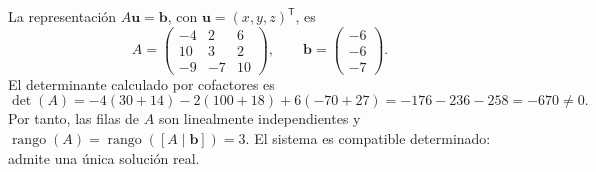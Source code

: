 \documentclass[spanish,letterpaper,oneside]{article}
\begin{document}
La representación $A\mathbf u=\mathbf b$, con $\mathbf u=(x,y,z)^{\mathsf T}$, es
\[
A=\begin{pmatrix}-4&2&6\\10&3&2\\-9&-7&10\end{pmatrix},\qquad
\mathbf b=\begin{pmatrix}-6\\-6\\-7\end{pmatrix}.
\]
El determinante calculado por cofactores es
\[
\det(A)=-4(30+14)-2(100+18)+6(-70+27)
=-176-236-258=-670\neq0.
\]
Por tanto, las filas de $A$ son linealmente independientes y
$\operatorname{rango}(A)=\operatorname{rango}([A\mid\mathbf b])=3$.
El sistema es compatible determinado: admite una única solución real.
\end{document}
